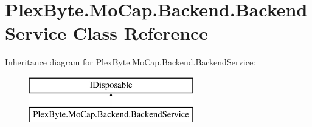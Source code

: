 \hypertarget{class_plex_byte_1_1_mo_cap_1_1_backend_1_1_backend_service}{}\section{Plex\+Byte.\+Mo\+Cap.\+Backend.\+Backend\+Service Class Reference}
\label{class_plex_byte_1_1_mo_cap_1_1_backend_1_1_backend_service}
Inheritance diagram for Plex\+Byte.\+Mo\+Cap.\+Backend.\+Backend\+Service\+:\begin{figure}[H]
\begin{center}
\leavevmode
\includegraphics[height=2.000000cm]{class_plex_byte_1_1_mo_cap_1_1_backend_1_1_backend_service}
\end{center}
\end{figure}
